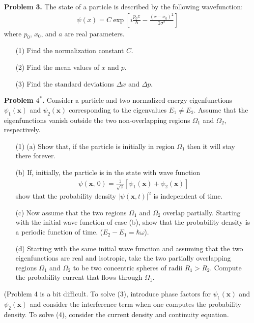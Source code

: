 \documentclass[floatfix,nofootinbib,superscriptaddress,fleqn]{revtex4}
\begin{document}
\noindent \textbf{Problem 3.} 
The state of a particle is described by the following wavefunction:
\begin{align*}
\psi(x) = C\exp\left[
i\frac{p_0 x}{\hbar} - \frac{(x-x_0)^2}{2\sigma^2} 
\right]
\end{align*}
where $p_0$, $x_0$, and $a$ are real parameters. 
\begin{itemize}
\item[(1)] Find the normalization constant $C$.
\item[(2)] Find the mean values of $x$ and $p$.
\item[(3)] Find the standard deviations $\Delta x$ and $\Delta p$.
\end{itemize}
\vspace{1cm}

\noindent \textbf{Problem $4^*$.}
Consider a particle and two normalized energy eigenfunctions
$\psi_1(\bm{x})$ and $\psi_2(\bm{x})$ corresponding to the eigenvalues
$E_1\neq E_2$. Assume that the eigenfunctions vanish outside the two 
non-overlapping regions $\Omega_1$ and $\Omega_2$, respectively. 
\begin{itemize}
\item[(1)] (a) Show that, if the particle is initially in region
  $\Omega_1$ then it will stay there forever. 
\item[(b)] If, initially, the particle is in the state with wave function
\begin{align*}
  \psi(\bm{x},\,0) = \frac1{\sqrt{2}} [\psi_1(\bm{x}) +
  \psi_2(\bm{x})] 
\end{align*}
show that the probability density $|\psi(\bm{x},t)|^2$ is independent
of time. 
\item[(c)] Now assume that the two regions $\Omega_1$ and $\Omega_2$
  overlap partially. Starting with the initial wave function of case
  (b), show that the probability density is a periodic function of 
time. ($E_2-E_1=\hbar \omega$).
\item[(d)] Starting with the same initial wave function and assuming
  that the two eigenfunctions are real and isotropic, take the two
  partially overlapping regions $\Omega_1$ and $\Omega_2$ to be 
two concentric spheres of radii $R_1>R_2$. Compute the probability
current that flows through $\Omega_1$.
\end{itemize}
(Problem 4 is a bit difficult. To solve (3), introduce phase
factors for $\psi_1(\bm{x})$ and $\psi_2(\bm{x})$ and consider the
interference term when one computes the probability density. To solve
(4), consider the current density and continuity equation.  
\end{document}
